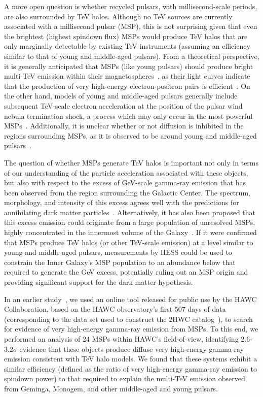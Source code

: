 \documentclass[aps,prd,twocolumn,amsmath,superscriptaddress,amssymb,showpacs,floatfix,nofootinbib,longbibliography,preprintnumbers]{revtex4-1}
\begin{document}
A more open question is whether recycled pulsars, with millisecond-scale periods, are also surrounded by TeV halos. Although no TeV sources are currently associated with a millisecond pulsar (MSP), this is not surprising given that even the brightest (highest spindown flux) MSPs would produce TeV halos that are only marginally detectable by existing TeV instruments  (assuming an efficiency similar to that of young and middle-aged pulsars). From a theoretical perspective, it is generally anticipated that MSPs (like young pulsars) should produce bright multi-TeV emission within their magnetospheres~\cite{Venter:2015gga,Bednarek:2016gpp,Venter:2015oza}, as their light curves indicate that the production of very high-energy electron-positron pairs is efficient~\cite{Venter:2015gga}. On the other hand, models of young and middle-aged pulsars generally include subsequent TeV-scale electron acceleration at the position of the pulsar wind nebula termination shock, a process which may only occur in the most powerful MSPs~\cite{2011ApJ...741...39S, Gaensler:2006ua}. Additionally, it is unclear whether or not diffusion is inhibited in the regions surrounding MSPs, as it is observed to be around young and middle-aged pulsars~\cite{Evoli:2018aza, Kun:2019sks}.




The question of whether MSPs generate TeV halos is important not only in terms of our understanding of the particle acceleration associated with these objects, but also with respect to the excess of GeV-scale gamma-ray emission that has been observed from the region surrounding the Galactic Center. The spectrum, morphology, and intensity of this excess agrees well with the predictions for annihilating dark matter particles~\cite{Hooper:2010mq, Daylan:2014rsa}. Alternatively, it has also been proposed that this excess emission could originate from a large population of unresolved MSPs, highly concentrated in the innermost volume of the Galaxy~\cite{Abazajian:2010zy, Lee:2015fea, Bartels:2015aea}. If it were confirmed that MSPs produce TeV halos (or other TeV-scale emission) at a level similar to young and middle-aged pulsars, measurements by HESS could be used to constrain the Inner Galaxy's MSP population to an abundance below that required to generate the GeV excess, potentially ruling out an MSP origin and providing significant support for the dark matter hypothesis.



In an earlier study~\cite{Hooper:2018fih}, we used an online tool released for public use by the HAWC Collaboration, based on the HAWC observatory's first 507 days of data (corresponding to the data set used to construct the 2HWC catalog~\cite{Abeysekara:2017hyn}), to search for evidence of very high-energy gamma-ray emission from MSPs. To this end, we performed an analysis of 24 MSPs within HAWC's field-of-view, identifying 2.6-3.2$\sigma$ evidence that these objects produce diffuse very high-energy gamma-ray emission consistent with TeV halo models. We found that these systems exhibit a similar efficiency (defined as the ratio of very high-energy gamma-ray emission to spindown power) to that required to explain the multi-TeV emission observed from Geminga, Monogem, and other middle-aged and young pulsars. 
\end{document}
